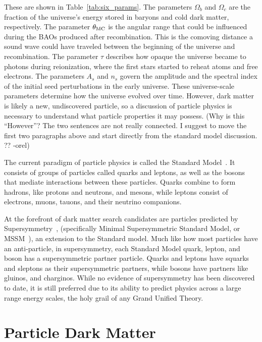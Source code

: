 These are shown in Table~\ref{tab:six_params}.
The parameters $\Omega_b$ and $\Omega_c$ are the fraction of the universe's energy stored in baryons and cold dark matter, respectively.
The parameter $\theta_{\textrm{MC}}$ is the angular range that could be influenced during the BAOs produced after recombination.
This is the comoving distance a sound wave could have traveled between the beginning of the universe and recombination.
The parameter $\tau$ describes how opaque the universe became to photons during reionization, where the first stars started to reheat atoms and free electrons.
The parameters $A_s$ and $n_s$ govern the amplitude and the spectral index of the initial seed perturbations in the early universe.
These universe-scale parameters determine how the universe evolved over time.
However, dark matter is likely a new, undiscovered particle,  so a discussion of particle physics is necessary to understand what particle properties it may possess.
{\color{red}(Why is this ``However''? The two sentences are not really connected.  I suggest to move the first two paragraphs above and start directly from the standard model discussion. ?? -orel)}


The current paradigm of particle physics is called the Standard Model~\cite{standardmodel}.
It consists of groups of particles called quarks and leptons, as well as the bosons that mediate interactions between these particles.
Quarks combine to form hadrons, like protons and neutrons, and mesons, while leptons consist of electrons, muons, tauons, and their neutrino companions.

At the forefront of dark matter search candidates are particles predicted by Supersymmetry~\cite{Jungman:1995df}, (specifically Minimal Supersymmetric Standard Model, or MSSM~\cite{MSSM,supersym1}), an extension to the Standard model.
Much like how most particles have an anti-particle, in supersymmetry, each Standard Model quark, lepton, and boson has a supersymmetric partner particle.
Quarks and leptons have squarks and sleptons as their supersymmetric partners, while bosons have partners like gluinos, and charginos.
While no evidence of supersymmetry has been discovered to date, it is still preferred due to its ability to predict physics across a large range energy scales, the holy grail of any Grand Unified Theory.


\section{Particle Dark Matter}\label{sec_particledm}


